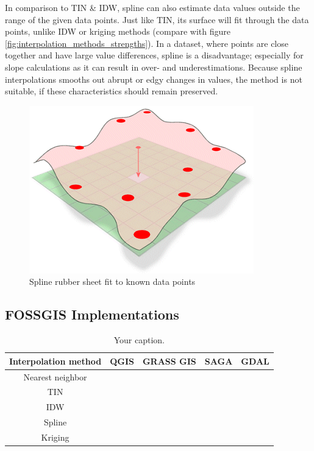 In comparison to TIN \& IDW, spline can also estimate data values outside the range of the given data points. Just like TIN, its surface will fit through the data points, unlike IDW or kriging methods (compare with figure \ref{fig:interpolation_methods_strengths}). In a dataset, where points are close together and have large value differences, spline is a disadvantage; especially for slope calculations as it can result in over- and underestimations. \cite{wasser_going_2020} Because spline interpolations smooths out abrupt or \ldq{}edgy\rdq{} changes in values, the method is not suitable, if these characteristics should remain preserved.

\begin{figure}
	\centering
	\includegraphics[width=.5\linewidth]{images/spline.png}
	\caption{Spline \ldq{}rubber sheet\rdq{} fit to known data points \cite{albrecht_spline_2005}}
	\label{fig:spline}
\end{figure}


\subsection{FOSSGIS Implementations}

\begin{table}[b!]
	\centering
	\begin{tabular}{c|c|c|c|c}
		Interpolation method & QGIS & GRASS GIS & SAGA & GDAL\\
		\hline
		Nearest neighbor & \cmark &\cmark &\cmark & \cmark \\
		\hline
		TIN & \cmark &\cmark &\cmark & \cmark \\
		\hline
		IDW & \cmark &\cmark &\cmark & \cmark \\
		\hline
		Spline & \xmark &\cmark &\cmark & \xmark \\
		\hline
		Kriging & \xmark &\cmark &\cmark & \xmark \\
	\end{tabular}
	\caption{\label{tab:table-name}Your caption.}
\end{table}







